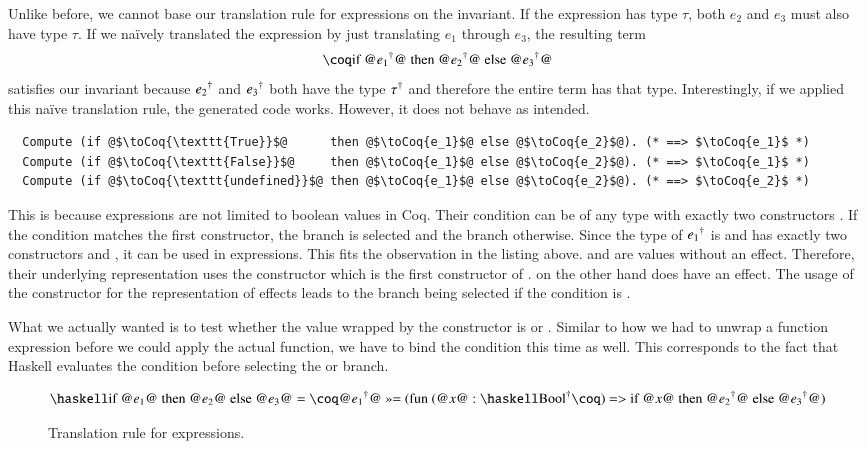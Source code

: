 Unlike before, we cannot base our translation rule for  expressions on the invariant.
If the expression  has type $\tau$, both $e_2$ and $e_3$ must also have type $\tau$.
If we naïvely translated the expression by just translating $e_1$ through $e_3$, the resulting term
\[
  \coqM{if @$\toCoqX{e_1}$@ then @$\toCoqX{e_2}$@ else @$\toCoqX{e_3}$@}
\]
satisfies our invariant because ${e_2}^{\dagger}$ and ${e_3}^{\dagger}$ both have the type ${\tau}^{\dagger}$ and therefore the entire term has that type.
Interestingly, if we applied this naïve translation rule, the generated code works.
However, it does not behave as intended.
\begin{verbatim}
  Compute (if @$\toCoq{\texttt{True}}$@      then @$\toCoq{e_1}$@ else @$\toCoq{e_2}$@). (* ==> $\toCoq{e_1}$ *)
  Compute (if @$\toCoq{\texttt{False}}$@     then @$\toCoq{e_1}$@ else @$\toCoq{e_2}$@). (* ==> $\toCoq{e_1}$ *)
  Compute (if @$\toCoq{\texttt{undefined}}$@ then @$\toCoq{e_1}$@ else @$\toCoq{e_2}$@). (* ==> $\toCoq{e_2}$ *)
\end{verbatim}
This is because  expressions are not limited to boolean values in Coq.
Their condition can be of any type with exactly two constructors \cite[p.~48]{CoqDevTeam:2018}.
If the condition matches the first constructor, the  branch is selected and the  branch otherwise.
Since the type of ${e_1}^{\dagger}$ is  and  has exactly two constructors  and , it can be used in  expressions.
This fits the observation in the listing above.
 and  are values without an effect.
Therefore, their underlying representation uses the  constructor which is the first constructor of .
 on the other hand does have an effect.
The usage of the  constructor for the representation of effects leads to the  branch being selected if the condition is .

What we actually wanted is to test whether the value wrapped by the  constructor is  or .
Similar to how we had to unwrap a function expression before we could apply the actual function, we have to bind the condition this time as well.
This corresponds to the fact that Haskell evaluates the condition before selecting the  or  branch.

\begin{figure}[H]
  \[
    \haskellM{if @$e_1$@ then @$e_2$@ else @$e_3$@}
      = \coqM{@$\toCoqX{e_1}$@ >>= (fun (@$x$@ :}\;\toCoq{\haskellM{Bool}}\coqM{) => if @$x$@ then @$\toCoqX{e_2}$@ else @$\toCoqX{e_3}$@)}
  \]
  \caption{Translation rule for  expressions.}
  \label{fig:translation:expr:if}
\end{figure}

